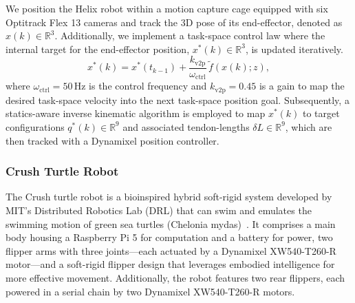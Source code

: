 We position the Helix robot within a motion capture cage equipped with six Optitrack Flex 13 cameras and track the 3D pose of its end-effector, denoted as $x(k) \in \mathbb{R}^3$. Additionally, we implement a task-space control law where the internal target for the end-effector position, $x^*(k) \in \mathbb{R}^3$, is updated iteratively.
\begin{equation}
    x^*(k) = x^*(t_{k-1}) + \frac{k_\mathrm{v2p}}{\omega_\mathrm{ctrl}} \, \tilde{f}(x(k); z),
\end{equation}
where $\omega_\mathrm{ctrl} = 50 \, \mathrm{Hz}$ is the control frequency and $k_\mathrm{v2p} = 0.45$ is a gain to map the desired task-space velocity into the next task-space position goal. 
Subsequently, a statics-aware inverse kinematic algorithm is employed to map $x^*(k)$ to target configurations $q^*(k) \in \mathbb{R}^9$ and associated tendon-lengths $\delta L \in \mathbb{R}^{9}$, which are then tracked with a Dynamixel position controller.

\subsubsection{Crush Turtle Robot}
The Crush turtle robot is a bioinspired hybrid soft-rigid system developed by MIT’s Distributed Robotics Lab (DRL) that can swim and emulates the swimming motion of green sea turtles (Chelonia mydas)~\citep{van2022new, van2023soft}. It comprises a main body housing a Raspberry Pi 5 for computation and a battery for power, two flipper arms with three joints—each actuated by a Dynamixel XW540-T260-R motor—and a soft-rigid flipper design that leverages embodied intelligence for more effective movement. Additionally, the robot features two rear flippers, each powered in a serial chain by two Dynamixel XW540-T260-R motors.

